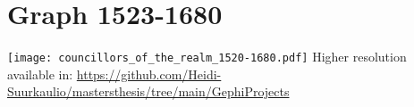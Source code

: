 \section{Graph 1523-1680}
\texttt{[image: councillors\_of\_the\_realm\_1520-1680.pdf]}
Higher resolution available in: \url{https://github.com/Heidi-Suurkaulio/mastersthesis/tree/main/GephiProjects}